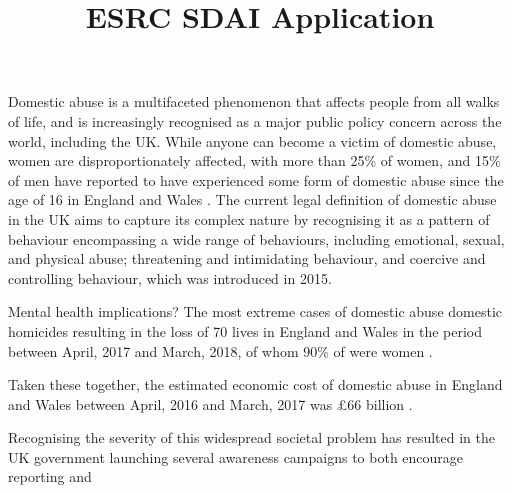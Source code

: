 \documentclass[12pt, letterpaper]{article}
\begin{document}
\title{ESRC SDAI Application}
\maketitle

Domestic abuse is a multifaceted phenomenon that affects people from all walks of life, and is increasingly recognised as a major public policy concern across the world, including the UK. While anyone can become a victim of domestic abuse, women are disproportionately affected, with more than 25\% of women, and 15\% of men have reported to have experienced some form of domestic abuse since the age of 16 in England and Wales \cite{ONS}. The current legal definition of domestic abuse in the UK \cite{govuk} aims to capture its complex nature by recognising it as a pattern of behaviour encompassing a wide range of behaviours, including emotional, sexual, and physical abuse; threatening and intimidating behaviour, and coercive and controlling behaviour, which was introduced in 2015. 

Mental health implications? The most extreme cases of domestic abuse domestic homicides resulting in the loss of 70 lives in England and Wales in the period between April, 2017 and March, 2018, of whom 90\% of were women \cite{homic}.


Taken these together, the estimated economic cost of domestic abuse in England and Wales between April, 2016 and March, 2017 was £66 billion \cite{costs}. 



Recognising the severity of this widespread societal problem has resulted in the UK government launching several awareness campaigns to both encourage reporting and 






\end{document}
